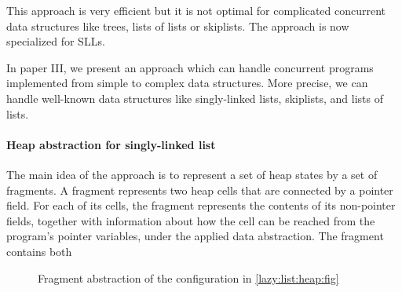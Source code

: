 
This approach is very efficient but it is not optimal for complicated concurrent data structures like trees, lists of lists or skiplists. The  approach is now specialized for SLLs. 

In paper III, we present an approach which can handle concurrent programs implemented from simple to complex data structures. More precise, we can handle well-known data structures like singly-linked lists, skiplists, and lists of lists. 
\paragraph{Heap abstraction for singly-linked list}
The main idea of the approach is to represent a set of heap states by a set
of fragments. A fragment represents two heap cells that are connected by a pointer
field. For each of its cells, the fragment represents the contents of its non-pointer fields,
together with information about how the cell can be reached from the program’s pointer
variables, under the applied data abstraction. The fragment contains both
 \begin{figure}
\center
	
\caption{Fragment abstraction of the configuration in \ref{lazy:list:heap:fig}}
\label{fig:sllabs}
\end{figure}
 
